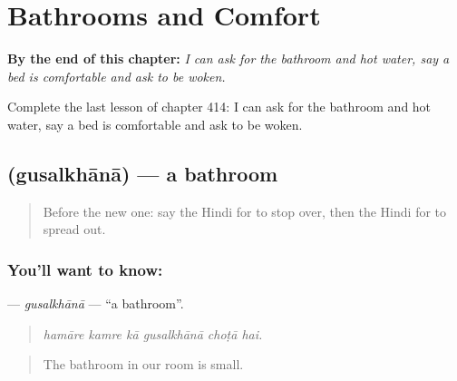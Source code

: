 
\chapter{Bathrooms and Comfort}
\label{ch:hi-bathrooms-and-comfort}

\begin{chapteropening}
\textbf{By the end of this chapter:} \emph{I can ask for the bathroom and hot water, say a bed is comfortable and ask to be woken.}

Complete the last lesson of chapter 414: I can ask for the bathroom and hot water, say a bed is comfortable and ask to be woken.
\end{chapteropening}

\section[\texorpdfstring{\hi{गुसलख़ाना} (gusalkhānā)}{गुसलख़ाना (gusalkhānā)}]{ (gusalkhānā) — a bathroom}

\label{lesson:HI-C414-gusalkhana}



\begin{quote}
Before the new one: say the Hindi for to stop over, then the Hindi for to spread out.
\end{quote}

\subsection*{You'll want to know: }
\textbf{} — \emph{gusalkhānā} — \textquotedblleft{}a bathroom\textquotedblright{}.

\begin{quote}
     
\end{quote}

\begin{quote}
\emph{hamāre kamre kā gusalkhānā choṭā hai.}
\end{quote}

\begin{quote}
The bathroom in our room is small.
\end{quote}

